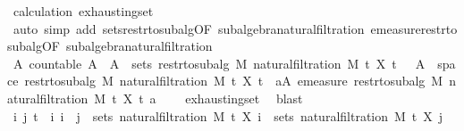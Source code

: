 \begin{isabellebody}
\ calculation{\isacharparenleft}{\kern0pt}{}{\isacharparenright}{\kern0pt}\ exhausting{\isacharunderscore}{\kern0pt}set{\isacharparenleft}{\kern0pt}{}{\isacharparenright}{\kern0pt}\ \isanewline
\ \ \ \ \isamarkupfalse%
\ {\isacharparenleft}{\kern0pt}auto\ simp\ add{\isacharcolon}{\kern0pt}\ sets{\isacharunderscore}{\kern0pt}restr{\isacharunderscore}{\kern0pt}to{\isacharunderscore}{\kern0pt}subalg{\isacharbrackleft}{\kern0pt}OF\ subalgebra{\isacharunderscore}{\kern0pt}natural{\isacharunderscore}{\kern0pt}filtration{\isacharbrackright}{\kern0pt}\ emeasure{\isacharunderscore}{\kern0pt}restr{\isacharunderscore}{\kern0pt}to{\isacharunderscore}{\kern0pt}subalg{\isacharbrackleft}{\kern0pt}OF\ subalgebra{\isacharunderscore}{\kern0pt}natural{\isacharunderscore}{\kern0pt}filtration{\isacharbrackright}{\kern0pt}{\isacharparenright}{\kern0pt}\isanewline
\ \ \isamarkupfalse%
\ \isamarkupfalse%
\ {\isachardoublequoteopen}{\isasymexists}A{\isachardot}{\kern0pt}\ countable\ A\ {\isasymand}\ A\ {\isasymsubseteq}\ sets\ {\isacharparenleft}{\kern0pt}restr{\isacharunderscore}{\kern0pt}to{\isacharunderscore}{\kern0pt}subalg\ M\ {\isacharparenleft}{\kern0pt}natural{\isacharunderscore}{\kern0pt}filtration\ M\ t\ X\ t\ {\isasymand}\ {\isasymUnion}\ A\ {\isacharequal}{\kern0pt}\ space\ {\isacharparenleft}{\kern0pt}restr{\isacharunderscore}{\kern0pt}to{\isacharunderscore}{\kern0pt}subalg\ M\ {\isacharparenleft}{\kern0pt}natural{\isacharunderscore}{\kern0pt}filtration\ M\ t\ X\ t\ {\isasymand}\ {\isacharparenleft}{\kern0pt}{\isasymforall}a{\isasymin}A{\isachardot}{\kern0pt}\ emeasure\ {\isacharparenleft}{\kern0pt}restr{\isacharunderscore}{\kern0pt}to{\isacharunderscore}{\kern0pt}subalg\ M\ {\isacharparenleft}{\kern0pt}natural{\isacharunderscore}{\kern0pt}filtration\ M\ t\ X\ t\ a\ {\isasymnoteq}\ {\isasyminfinity}{\isacharparenright}{\kern0pt}{\isachardoublequoteclose}\ \isamarkupfalse%
\ exhausting{\isacharunderscore}{\kern0pt}set\ \isamarkupfalse%
\ blast\isanewline
\ \ \isamarkupfalse%
\ {\isachardoublequoteopen}{\isasymAnd}i\ j{\isachardot}{\kern0pt}\ {\isasymlbrakk}t\ {\isasymle}\ i{\isacharsemicolon}{\kern0pt}\ i\ {\isasymle}\ j{\isasymrbrakk}\ {\isasymLongrightarrow}\ sets\ {\isacharparenleft}{\kern0pt}natural{\isacharunderscore}{\kern0pt}filtration\ M\ t\ X\ i{\isacharparenright}{\kern0pt}\ {\isasymsubseteq}\ sets\ {\isacharparenleft}{\kern0pt}natural{\isacharunderscore}{\kern0pt}filtration\ M\ t\ X\ j{\isacharparenright}{\kern0pt}{\isachardoublequoteclose}\ \isamarkupfalse%

\end{isabellebody}
